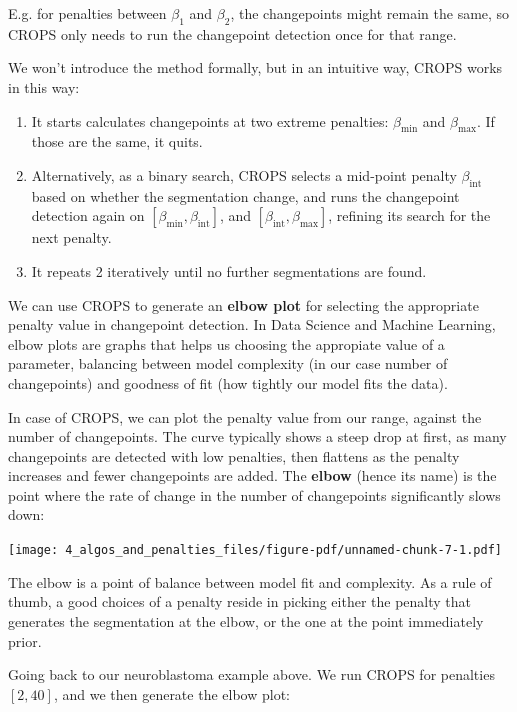\documentclass[
  letterpaper,
  DIV=11,
  numbers=noendperiod]{scrreprt}
\begin{document}
E.g. for penalties between \(\beta_1\) and \(\beta_2\), the changepoints
might remain the same, so CROPS only needs to run the changepoint
detection once for that range.

We won't introduce the method formally, but in an intuitive way, CROPS
works in this way:

\begin{enumerate}
\def\labelenumi{\arabic{enumi}.}
\item
  It starts calculates changepoints at two extreme penalties:
  \(\beta_{\text{min}}\) and \(\beta_{\text{max}}\). If those are the
  same, it quits.
\item
  Alternatively, as a binary search, CROPS selects a mid-point penalty
  \(\beta_\text{int}\) based on whether the segmentation change, and
  runs the changepoint detection again on
  \([\beta_{\text{min}}, \beta_{\text{int}}]\), and
  \([\beta_{\text{int}}, \beta_{\text{max}}]\), refining its search for
  the next penalty.
\item
  It repeats 2 iteratively until no further segmentations are found.
\end{enumerate}

We can use CROPS to generate an \textbf{elbow plot} for selecting the
appropriate penalty value in changepoint detection. In Data Science and
Machine Learning, elbow plots are graphs that helps us choosing the
appropiate value of a parameter, balancing between model complexity (in
our case number of changepoints) and goodness of fit (how tightly our
model fits the data).

In case of CROPS, we can plot the penalty value from our range, against
the number of changepoints. The curve typically shows a steep drop at
first, as many changepoints are detected with low penalties, then
flattens as the penalty increases and fewer changepoints are added. The
\textbf{elbow} (hence its name) is the point where the rate of change in
the number of changepoints significantly slows down:

\texttt{[image: 4\_algos\_and\_penalties\_files/figure-pdf/unnamed-chunk-7-1.pdf]}

The elbow is a point of balance between model fit and complexity. As a
rule of thumb, a good choices of a penalty reside in picking either the
penalty that generates the segmentation at the elbow, or the one at the
point immediately prior.

Going back to our neuroblastoma example above. We run CROPS for
penalties \([2, 40]\), and we then generate the elbow plot:
\end{document}
